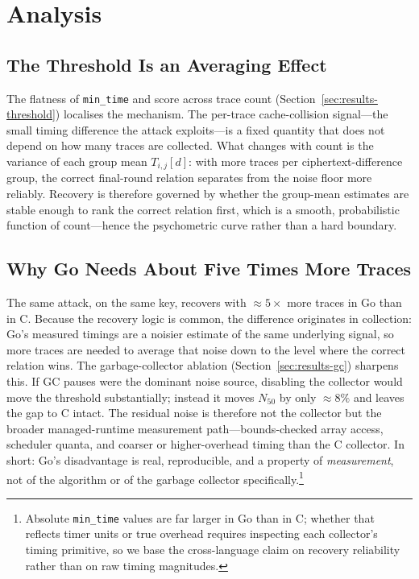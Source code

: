 
\section{Analysis}
\label{sec:analysis}

\subsection{The Threshold Is an Averaging Effect}
\label{sec:analysis-statistical}
The flatness of \texttt{min\_time} and score across trace count
(Section~\ref{sec:results-threshold}) localises the mechanism. The per-trace
cache-collision signal---the small timing difference the attack exploits---is a
fixed quantity that does not depend on how many traces are collected. What
changes with count is the variance of each group mean $T_{i,j}[d]$: with more
traces per ciphertext-difference group, the correct final-round relation
separates from the noise floor more reliably. Recovery is therefore governed by
whether the group-mean estimates are stable enough to rank the correct relation
first, which is a smooth, probabilistic function of count---hence the
psychometric curve rather than a hard boundary.

\subsection{Why Go Needs About Five Times More Traces}
\label{sec:analysis-crosslang}
The same attack, on the same key, recovers with $\approx 5\times$ more traces in
Go than in C. Because the recovery logic is common, the difference originates in
collection: Go's measured timings are a noisier estimate of the same underlying
signal, so more traces are needed to average that noise down to the level where
the correct relation wins. The garbage-collector ablation
(Section~\ref{sec:results-gc}) sharpens this. If GC pauses were the dominant
noise source, disabling the collector would move the threshold substantially;
instead it moves $N_{50}$ by only $\approx 8\%$ and leaves the gap to C intact.
The residual noise is therefore not the collector but the broader managed-runtime
measurement path---bounds-checked array access, scheduler quanta, and coarser or
higher-overhead timing than the C collector. In short: Go's disadvantage is
real, reproducible, and a property of \emph{measurement}, not of the algorithm
or of the garbage collector specifically.\footnote{Absolute \texttt{min\_time}
values are far larger in Go than in C; whether that reflects timer units or true
overhead requires inspecting each collector's timing primitive, so we base the
cross-language claim on recovery reliability rather than on raw timing
magnitudes.}

